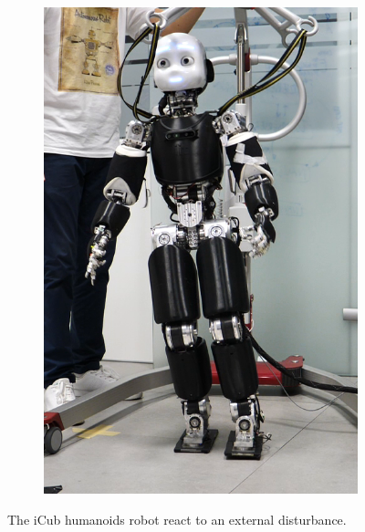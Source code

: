 \begin{figure}[!t]
\begin{subfigure}[b]{0.32\textwidth}
        \includegraphics[width=\columnwidth]{chapter_centroidal_mpc/figures/icub6.png}
    \end{subfigure}
    \caption{The iCub humanoids robot react to an external disturbance.}
    \label{fig:icub3_centroidal_mpc}
\end{figure}

